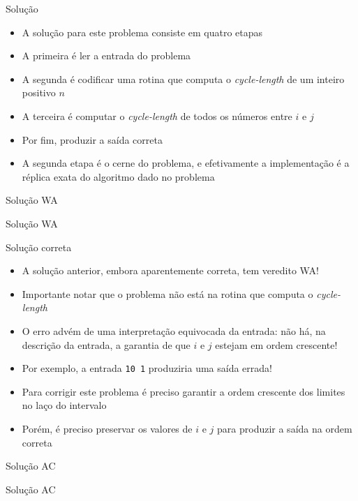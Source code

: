 \begin{frame}[fragile]{Solução}

    \begin{itemize}
        \item A solução para este problema consiste em quatro etapas

        \item A primeira é ler a entrada do problema

        \item A segunda é codificar uma rotina que computa o \textit{cycle-length} de um inteiro
            positivo $n$

        \item A terceira é computar o \textit{cycle-length} de todos os números entre $i$ e $j$

        \item Por fim, produzir a saída correta 

        \item A segunda etapa é o cerne do problema, e efetivamente a implementação é a réplica
            exata do algoritmo dado no problema
   \end{itemize}

\end{frame}

\begin{frame}[fragile]{Solução WA}
\end{frame}

\begin{frame}[fragile]{Solução WA}
\end{frame}

\begin{frame}[fragile]{Solução correta}

    \begin{itemize}
        \item A solução anterior, embora aparentemente correta, tem veredito WA!

        \item Importante notar que o problema não está na rotina que computa o
            \textit{cycle-length}

        \item O erro advém de uma interpretação equivocada da entrada: não há, na descrição
            da entrada, a garantia de que $i$ e $j$ estejam em ordem crescente!

        \item Por exemplo, a entrada \texttt{10 1} produziria uma saída errada!

        \item Para corrigir este problema é preciso garantir a ordem crescente dos limites
            no laço do intervalo

        \item Porém, é preciso preservar os valores de $i$ e $j$ para produzir a saída na 
            ordem correta
    \end{itemize}

\end{frame}

\begin{frame}[fragile]{Solução AC}
\end{frame}

\begin{frame}[fragile]{Solução AC}
\end{frame}
